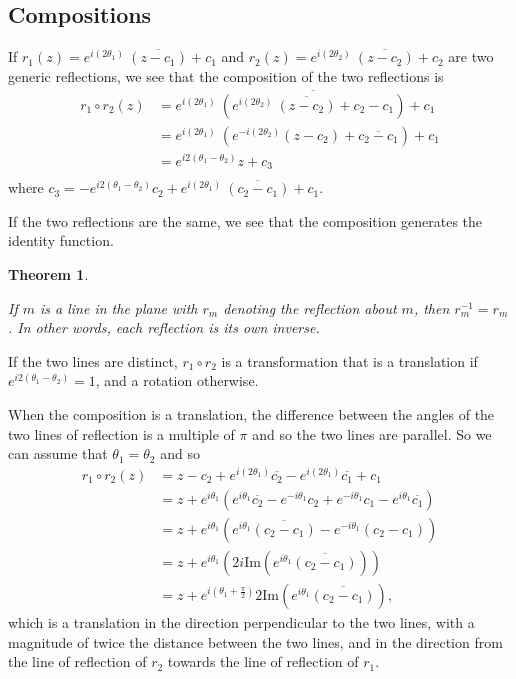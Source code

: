 \documentclass[
]{book}
\newtheorem{theorem}{Theorem}[chapter]
\theoremstyle{definition}
\theoremstyle{definition}
\theoremstyle{definition}
\theoremstyle{definition}
\theoremstyle{remark}
\begin{document}
\hypertarget{compositions-1}{%
\subsection{Compositions}\label{compositions-1}}

If \(r_1 (z) = e^{i(2\theta_1)} \: \overline{(z-c_1)} + c_1\) and \(r_2 (z) = e^{i(2\theta_2)} \: \overline{(z-c_2)} + c_2\) are two generic reflections, we see that the composition of the two reflections is
\begin{align*}
     r_1 \circ r_2 (z) & = e^{i (2\theta_1)} \: \overline{ \left( e^{i(2\theta_2)} \: \overline{(z-c_2)} + c_2-c_1 \right)} + c_1 \\
     & = e^{i (2\theta_1)} \: \left( e^{-i(2\theta_2)} (z-c_2) + \overline{c_2-c_1} \right) + c_1 \\
     & = e^{i 2(\theta_1-\theta_2)} z + c_3\\
\end{align*}
where \(c_3 = -e^{i2(\theta_1-\theta_2)}c_2 + e^{i(2\theta_1)} \: \overline{\left(c_2-c_1\right)} +c_1\).

If the two reflections are the same, we see that the composition generates the identity function.

\begin{theorem}
\protect\hypertarget{thm:unlabeled-div-278}{}\label{thm:unlabeled-div-278}

If \(m\) is a line in the plane with \(r_m\) denoting the reflection about \(m\), then \(r_m^{-1}=r_m\). In other words, each reflection is its own inverse.

\end{theorem}

If the two lines are distinct, \(r_1 \circ r_2\) is a transformation that is a translation if \(e^{i 2(\theta_1-\theta_2)}=1\), and a rotation otherwise.

When the composition is a translation, the difference between the angles of the two lines of reflection is a multiple of \(\pi\) and so the two lines are parallel. So we can assume that \(\theta_1=\theta_2\) and so
\begin{align*}
    r_1 \circ r_2 (z) & = z-c_2 +e^{i(2\theta_1)} \overline{c_2}  - e^{i(2\theta_1)} \overline{c_1} + c_1  \\
    & = z+ e^{i\theta_1}  \left( e^{i\theta_1} \overline{c_2} - e^{-i\theta_1} c_2 + e^{-i\theta_1}c_1 - e^{i\theta_1} \overline{c_1} \right)  \\
    & = z + e^{i \theta_1} \left( e^{i \theta_1} \overline{(c_2-c_1)} - e^{-i\theta_1} (c_2-c_1)\right) \\
    & = z + e^{i\theta_1} \left( 2i \mbox{Im} \left( e^{i \theta_1} \overline{(c_2-c_1)} \right) \right) \\
    & = z + e^{i (\theta_1+\frac{\pi}{2})} 2 \mbox{Im} \left( e^{i \theta_1} \overline{(c_2-c_1)} \right) ,
\end{align*}
which is a translation in the direction perpendicular to the two lines, with a magnitude of twice the distance between the two lines, and in the direction from the line of reflection of \(r_2\) towards the line of reflection of \(r_1\).
\end{document}
